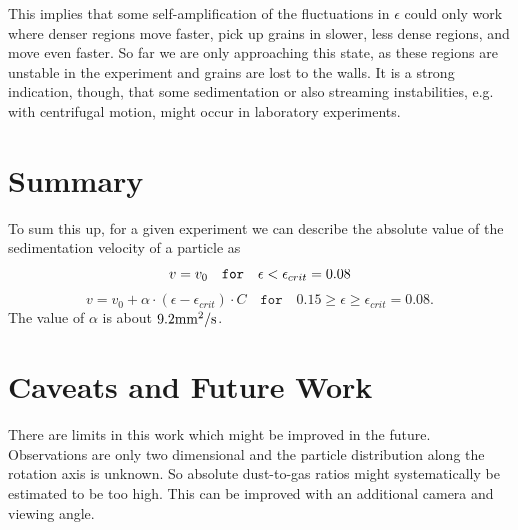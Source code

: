 This implies that some self-amplification {of the fluctuations in $\epsilon$} could only work where denser regions move faster,
pick up grains in slower, less dense regions, and move even faster. So far we are only approaching this state, as these
regions are unstable in the experiment and grains are lost to the walls.
It is a strong indication, though, that some 
sedimentation or also streaming instabilities, e.g. with centrifugal motion, might occur in laboratory
experiments.

\section{Summary}

To sum this up, for a given experiment we can describe the absolute value of the sedimentation velocity of a particle as 
\begin{equation}
v = v_0  \quad \texttt{for} \quad \epsilon < \epsilon_{crit}=0.08\\
\end{equation}
\begin{equation}
v = v_0 + \alpha \cdot (\epsilon-\epsilon_{crit}) \cdot C  \quad \texttt{for} \quad 0.15 \geq \epsilon \geq \epsilon_{crit}=0.08. 
\label{eq.collective}
\end{equation}
The value of $\alpha$ is about $9.2 \rm mm^2/s$.



\section{Caveats and Future Work}

There are limits in this work which might be improved in the future. 
Observations are only two dimensional and the particle distribution along the rotation axis is unknown. So absolute dust-to-gas ratios might systematically be estimated to be too high. This can be improved with an additional camera and viewing angle.

